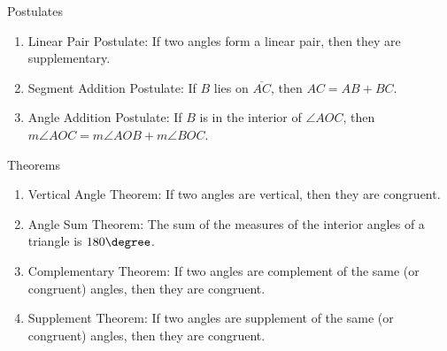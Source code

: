 Postulates 

\begin{enumerate}[label = \arabic*. ]
\item Linear Pair Postulate: If two angles form a linear pair, then they are supplementary.
\item Segment Addition Postulate: If $B$ lies on $\overline{AC}$, then $AC = AB + BC$.
\item Angle Addition Postulate: If $B$ is in the interior of $\angle{AOC}$, then $m\angle{AOC} = m\angle{AOB} + m\angle{BOC}$.
\end{enumerate} 

\vspce 

Theorems 

\begin{enumerate}[label = \arabic*. ]
\item Vertical Angle Theorem: If two angles are vertical, then they are congruent.
\item Angle Sum Theorem: The sum of the measures of the interior angles of a triangle is $180\degree$. 
\item Complementary Theorem: If two angles are complement of the same (or congruent) angles, then they are congruent.
\item Supplement Theorem: If two angles are supplement of the same (or congruent) angles, then they are congruent. 
\end{enumerate} 
